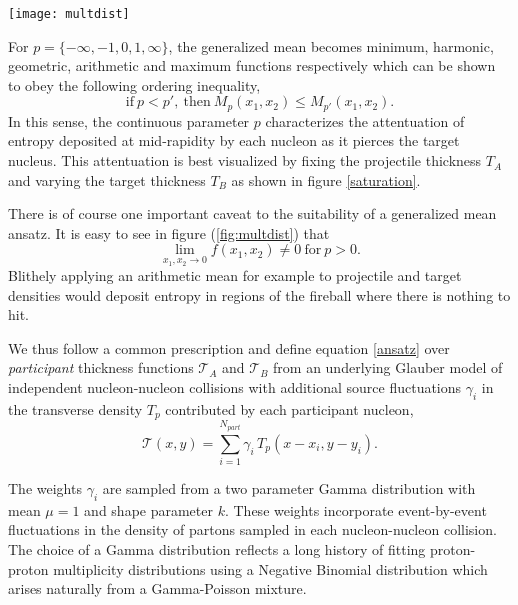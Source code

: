 \documentclass[aps,prl,reprint,amsmath,nofootinbib]{revtex4-1}
\begin{document}
\begin{figure*}[t]
    \texttt{[image: multdist]}
    \caption{\label{fig:multdist} Minimum bias pp, pPb and PbPb charged particle distributions for power $p=0$, fluctuation parameter $k=0.8$ and normalization factor $\kappa'_n$ indicated in the legend.}
\end{figure*}

For $p = \{-\infty,-1,0,1,\infty\}$, the generalized mean becomes minimum, harmonic, geometric, arithmetic and maximum functions respectively which can be shown
to obey the following ordering inequality, 
\begin{equation}
 \mathrm{if} ~ p<p', ~ \mathrm{then} ~ M_{p}(x_1,x_2) \le M_{p'}(x_1,x_2).
\end{equation}
In this sense, the continuous parameter $p$ characterizes the attentuation of entropy deposited at mid-rapidity by each nucleon as it pierces the target nucleus. This 
attentuation is best visualized by fixing the projectile thickness $T_A$ and varying the target thickness $T_B$ as shown in figure \ref{saturation}.

There is of course one important caveat to the suitability of a generalized mean ansatz. It is easy to see in figure (\ref{fig:multdist}) that
\begin{equation}
 \lim\limits_{x_1,x_2 \to 0} f(x_1,x_2) \ne 0 ~\mathrm{for} ~ p>0.
\end{equation}
Blithely applying an arithmetic mean for example to projectile and target densities would deposit entropy in regions of the fireball where 
there is nothing to hit. 

We thus follow a common prescription and define equation \ref{ansatz} over \emph{participant} thickness functions $\mathcal{T}_A$ and $\mathcal{T}_B$ from an underlying Glauber model of 
independent nucleon-nucleon collisions with additional source fluctuations $\gamma_i$ in the transverse density $T_p$ contributed by each participant nucleon,
\begin{equation}
 \label{thickness def}
 \mathcal{T}(x,y) = \sum\limits_{i=1}^{N_{part}} \gamma_i\, T_p(x-x_i,y-y_i).
\end{equation}

The weights $\gamma_i$ are sampled from a two parameter Gamma distribution with mean $\mu=1$ and shape parameter $k$. These weights incorporate event-by-event 
fluctuations in the density of partons sampled in each nucleon-nucleon collision. The choice of a Gamma distribution reflects a long history of fitting proton-proton 
multiplicity distributions using a Negative Binomial distribution which arises naturally from a Gamma-Poisson mixture.
\end{document}
